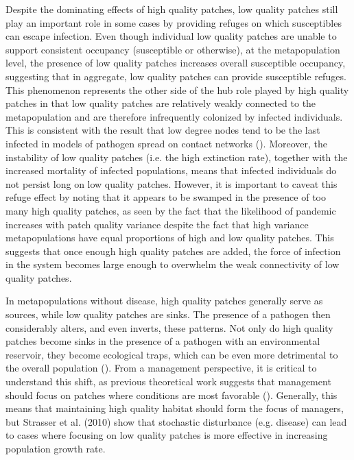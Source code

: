 \documentclass{svjour3}
\begin{document}
Despite the dominating effects of high quality patches, low quality patches still play an important role in some cases by providing refuges on which susceptibles can escape infection. Even though individual low quality patches are unable to support consistent occupancy (susceptible or otherwise), at the metapopulation level, the presence of low quality patches increases overall susceptible occupancy, suggesting that in aggregate, low quality patches can provide susceptible refuges.  This phenomenon represents the other side of the hub role played by high quality patches in that low quality patches are relatively weakly connected to the metapopulation and are therefore infrequently colonized by infected individuals.  This is consistent with the result that low degree nodes tend to be the last infected in models of pathogen spread on contact networks (\cite{Barthelemy2004}).  Moreover, the instability of low quality patches (i.e. the high extinction rate), together with the increased mortality of infected populations, means that infected individuals do not persist long on low quality patches.   However, it is important to caveat this refuge effect by noting that it appears to be swamped in the presence of too many high quality patches, as seen by the fact that the likelihood of pandemic increases with patch quality variance despite the fact that high variance metapopulations have equal proportions of high and low quality patches.  This suggests that once enough high quality patches are added, the force of infection in the system becomes large enough to overwhelm the weak connectivity of low quality patches.  

In metapopulations without disease, high quality patches generally serve as sources, while low quality patches are sinks.  The presence of a pathogen then considerably alters, and even inverts, these patterns.  Not only do high quality patches become sinks in the presence of a pathogen with an environmental reservoir, they become ecological traps, which can be even more detrimental to the overall population (\cite{Kristan2003}).  From a management perspective, it is critical to understand this shift, as previous theoretical work suggests that management should focus on patches where conditions are most favorable (\cite{Strasser2010}).  Generally, this means that maintaining high quality habitat should form the focus of managers, but Strasser et al. (2010) show that stochastic disturbance (e.g. disease) can lead to cases where focusing on low quality patches is more effective in increasing population growth rate.
\end{document}
